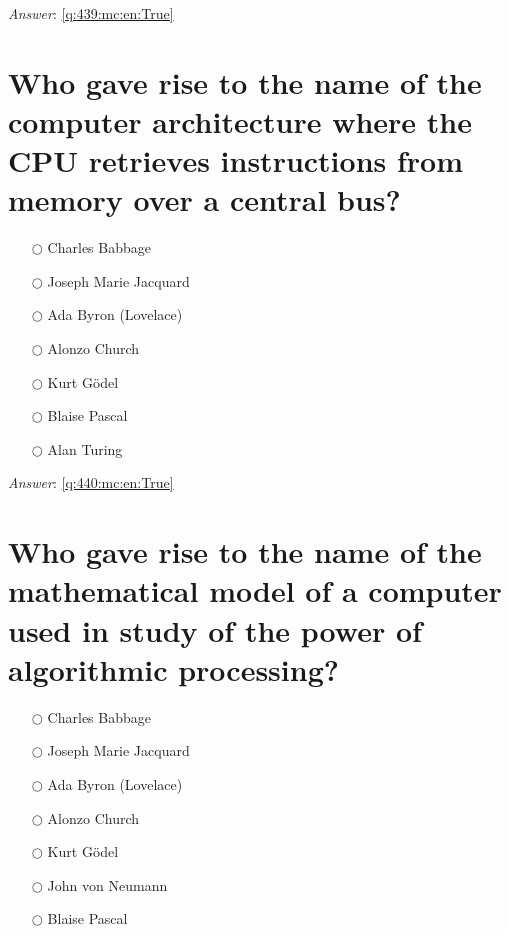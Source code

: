 \documentclass[a4paper,11pt,oneside]{book}
\begin{document}
\begin{sloppypar}
\vspace{1cm}

\textit{Answer}: \autoref{q:439:mc:en:True}



\section{Who gave rise to the name of the computer architecture where the CPU retrieves instructions from memory over a central bus?}

\label{q:440:mc:en:False}

\begin{itemize}
  \item[$\bigcirc$] Charles Babbage
  \item[$\bigcirc$] Joseph Marie Jacquard
  \item[$\bigcirc$] Ada Byron (Lovelace)
  \item[$\bigcirc$] Alonzo Church
  \item[$\bigcirc$] Kurt G\"odel
  \item[$\bigcirc$] Blaise Pascal
  \item[$\bigcirc$] Alan Turing
\end{itemize}

\vspace{1cm}

\textit{Answer}: \autoref{q:440:mc:en:True}



\section{Who gave rise to the name of the mathematical model of a computer used in study of the power of algorithmic processing?}

\label{q:441:mc:en:False}

\begin{itemize}
  \item[$\bigcirc$] Charles Babbage
  \item[$\bigcirc$] Joseph Marie Jacquard
  \item[$\bigcirc$] Ada Byron (Lovelace)
  \item[$\bigcirc$] Alonzo Church
  \item[$\bigcirc$] Kurt G\"odel
  \item[$\bigcirc$] John von Neumann
  \item[$\bigcirc$] Blaise Pascal
\end{itemize}


\end{sloppypar}
\end{document}
